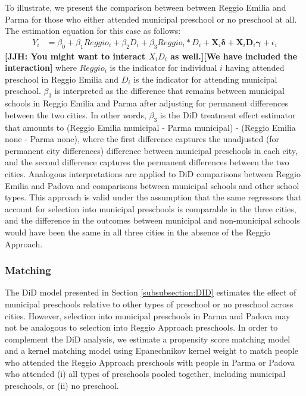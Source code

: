 To illustrate, we present the comparison between between Reggio Emilia and Parma for those who either attended municipal preschool or no preschool at all. The estimation equation for this case as follows:
\begin{eqnarray}  \label{eq:specific2}
Y_i & = \beta_0 + \beta_1 Reggio_i + \beta_2 D_i + \beta_3 Reggio_i * D_i + \bm{X}_i \bm{\delta} + \bm{X}_i \bm{D}_i \bm{\gamma} + \epsilon_i
\end{eqnarray}
\noindent \textbf{[JJH: You might want to interact $X_i D_i$ as well.][We have included the interaction]} where $Reggio_i$ is the indicator for individual $i$ having attended preschool in Reggio Emilia and $D_i$ is the indicator for attending municipal preschool. $\beta_3$ is interpreted as the difference that remains between municipal schools in Reggio Emilia and Parma after adjusting for permanent differences between the two cities. In other words, $\beta_3$ is the DiD treatment effect estimator that amounts to (Reggio Emilia municipal - Parma municipal) - (Reggio Emilia none - Parma none), where the first difference captures the unadjusted (for permanent city differences) difference between municipal preschools in each city, and the second difference captures the permanent differences between the two cities. Analogous interpretations are applied to DiD comparisons between Reggio Emilia and Padova and comparisons between municipal schools and other school types. This approach is valid under the assumption that the same regressors that account for selection into municipal preschools is comparable in the three cities, and the difference in the outcomes between municipal and non-municipal schools would have been the same in all three cities in the absence of the Reggio Approach.

\subsubsection{Matching}

The DiD model presented in Section \ref{subsubsection:DID} estimates the effect of municipal preschools relative to other types of preschool or no preschool across cities. However, selection into municipal preschools in Parma and Padova may not be analogous to selection into Reggio Approach preschools. In order to complement the DiD analysis, we estimate a propensity score matching model and a kernel matching model using Epanechnikov kernel weight to match people who attended the Reggio Approach preschools with people in Parma or Padova who attended (i) all types of preschools pooled together, including municipal preschools, or (ii) no preschool.

